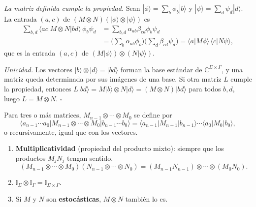 \documentclass[11pt, a4paper, twoside, openright]{report}
\begin{document}
\begin{tcolorbox}[colback=gray!5!white,colframe=gray!75!black,title=\textbf{Demostración de la caracterización}]
\textit{La matriz definida cumple la propiedad.} Sean $|\phi\rangle = \sum_b \phi_b|b\rangle$ y $|\psi\rangle = \sum_d \psi_d|d\rangle$. La entrada $(a,c)$ de $(M\otimes N)(|\phi\rangle\otimes|\psi\rangle)$ es
\begin{align*} \sum_{b,d}\langle ac|M\otimes N|bd\rangle\,\phi_b\psi_d &= \sum_{b,d}\alpha_{ab}\beta_{cd}\phi_b\psi_d \\ &= \Big(\sum_b\alpha_{ab}\phi_b\Big)\Big(\sum_d\beta_{cd}\psi_d\Big) = \langle a|M\phi\rangle\,\langle c|N\psi\rangle, \end{align*}
que es la entrada $(a,c)$ de $(M|\phi\rangle)\otimes(N|\psi\rangle)$.

\textit{Unicidad.} Los vectores $|b\rangle\otimes|d\rangle = |bd\rangle$ forman la base estándar de $\mathbb{C}^{\Sigma\times\Gamma}$, y una matriz queda determinada por sus imágenes de una base. Si otra matriz $L$ cumple la propiedad, entonces $L|bd\rangle = M|b\rangle\otimes N|d\rangle = (M\otimes N)|bd\rangle$ para todos $b,d$, luego $L = M\otimes N$. \hfill $\square$
\end{tcolorbox}

\noindent Para tres o más matrices, $M_{n-1}\otimes\cdots\otimes M_0$ se define por
\[ \langle a_{n-1}\cdots a_0|M_{n-1}\otimes\cdots\otimes M_0|b_{n-1}\cdots b_0\rangle = \langle a_{n-1}|M_{n-1}|b_{n-1}\rangle\cdots\langle a_0|M_0|b_0\rangle, \]
o recursivamente, igual que con los vectores.

\begin{tcolorbox}[colback=teal!5!white,colframe=teal!75!black,title=\textbf{Proposición: Propiedades del producto tensorial de matrices}]
\begin{enumerate}
    \item \textbf{Multiplicatividad} (propiedad del producto mixto): siempre que los productos $M_jN_j$ tengan sentido,
    \[ (M_{n-1}\otimes\cdots\otimes M_0)(N_{n-1}\otimes\cdots\otimes N_0) = (M_{n-1}N_{n-1})\otimes\cdots\otimes(M_0N_0). \]
    \item $\mathbb{I}_\Sigma\otimes\mathbb{I}_\Gamma = \mathbb{I}_{\Sigma\times\Gamma}$.
    \item Si $M$ y $N$ son \textbf{estocásticas}, $M\otimes N$ también lo es.
\end{enumerate}
\end{tcolorbox}
\end{document}
